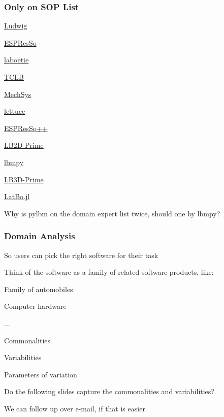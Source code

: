 \documentclass[t,12pt,numbers,fleqn]{beamer}
\begin{document}

\begin{frame}
\frametitle{Only on SOP List}

\begin{multicols}{2}	
  \bi
			\item \href{https://ludwig.epcc.ed.ac.uk/}{Ludwig}
			\item \href{http://espressomd.org/wordpress/}{ESPResSo}

			\item \href{https://github.com/maxlevesque/laboetie}{laboetie}
			\item \href{https://docs.tclb.io/}{TCLB}
			\item \href{http://mechsys.nongnu.org/}{MechSys}
			\item \href{https://github.com/Olllom/lettuce}{lettuce}
			\item \href{https://github.com/espressopp/espressopp}{ESPResSo++} 

			\item \href{http://faculty.fiu.edu/~sukopm/LBnD_Prime/LBnD_Prime.html}{LB2D-Prime}	

			\item \href{https://pypi.org/project/lbmpy/}{lbmpy}	
			\item \href{http://faculty.fiu.edu/~sukopm/LBnD_Prime/LBnD_Prime.html}{LB3D-Prime}	
			\item \href{https://github.com/UCL/LatBo.jl}{LatBo.jl}
	\ei
\end{multicols}

Why is pylbm on the domain expert list twice, should one by lbmpy?

\end{frame}


\begin{frame}
\frametitle{Domain Analysis}

\bi
\item So users can pick the right software for their task
\item Think of the software as a family of related software products, like:
\bi
\item Family of automobiles
\item Computer hardware
\item ...
\ei
\item Commonalities
\item Variabilities
\item Parameters of variation
\item Do the following slides capture the commonalities and variabilities?
\item We can follow up over e-mail, if that is easier
\ei

\end{frame}
\end{document}
